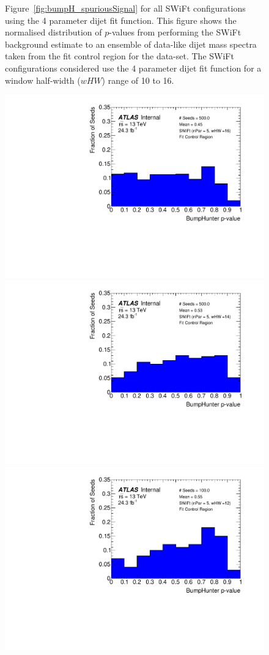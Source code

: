 \begin{figure}[!htb]
{}\hspace{-3mm}
\caption[Figure~\ref{fig:bumpH_spuriousSignal} for all SWiFt configurations using the 4 parameter dijet fit function.]
 {\label{fig:app-bumpH_spuriousSignal_4para}
 Figure~\ref{fig:bumpH_spuriousSignal} for all SWiFt configurations using the 4 parameter dijet fit function.
  This figure shows the normalised distribution of \bh{} $p$-values from performing the SWiFt background estimate to an ensemble of
  data-like dijet mass spectra taken from the fit control region for the \lm{} data-set.
  The SWiFt configurations considered use the 4 parameter dijet fit function for a window half-width ($wHW$) range of 10 to 16.
}
\end{figure}

\begin{figure}[!htb]
\captionsetup[subfigure]{aboveskip=0pt,justification=centering}
 {                                                    
  \includegraphics[width=0.48\linewidth, angle=0]{figs/Dibjet/LowMass/FitStudy_min566/pVal_bumpHunter_corrFitCR_5para_low16_high16.pdf}
}\hspace{-3mm}                                       
 {                                                    
  \includegraphics[width=0.48\linewidth, angle=0]{figs/Dibjet/LowMass/FitStudy_min566/pVal_bumpHunter_corrFitCR_5para_low14_high14.pdf}
}\hspace{-3mm}                                       
 {                                                    
  \includegraphics[width=0.48\linewidth, angle=0]{figs/Dibjet/LowMass/FitStudy_min566/pVal_bumpHunter_corrFitCR_5para_low12_high12.pdf}
}
\end{figure}
